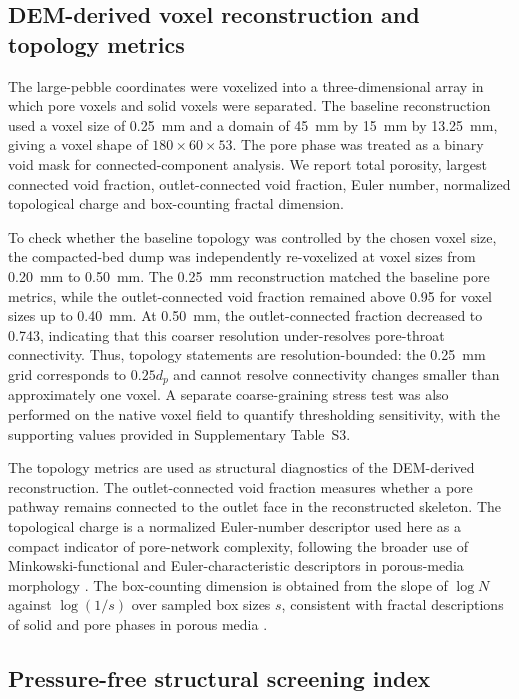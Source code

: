 \documentclass[preprint,12pt,authoryear]{elsarticle}
\begin{document}
\subsection{DEM-derived voxel reconstruction and topology metrics}

The large-pebble coordinates were voxelized into a three-dimensional array in which pore voxels and solid voxels were separated. The baseline reconstruction used a voxel size of \SI{0.25}{mm} and a domain of \SI{45}{mm} by \SI{15}{mm} by \SI{13.25}{mm}, giving a voxel shape of $180 \times 60 \times 53$. The pore phase was treated as a binary void mask for connected-component analysis. We report total porosity, largest connected void fraction, outlet-connected void fraction, Euler number, normalized topological charge and box-counting fractal dimension.

To check whether the baseline topology was controlled by the chosen voxel size, the compacted-bed dump was independently re-voxelized at voxel sizes from \SI{0.20}{mm} to \SI{0.50}{mm}. The \SI{0.25}{mm} reconstruction matched the baseline pore metrics, while the outlet-connected void fraction remained above 0.95 for voxel sizes up to \SI{0.40}{mm}. At \SI{0.50}{mm}, the outlet-connected fraction decreased to 0.743, indicating that this coarser resolution under-resolves pore-throat connectivity. Thus, topology statements are resolution-bounded: the \SI{0.25}{mm} grid corresponds to $0.25d_p$ and cannot resolve connectivity changes smaller than approximately one voxel. A separate coarse-graining stress test was also performed on the native voxel field to quantify thresholding sensitivity, with the supporting values provided in Supplementary Table~S3.

The topology metrics are used as structural diagnostics of the DEM-derived reconstruction. The outlet-connected void fraction measures whether a pore pathway remains connected to the outlet face in the reconstructed skeleton. The topological charge is a normalized Euler-number descriptor used here as a compact indicator of pore-network complexity, following the broader use of Minkowski-functional and Euler-characteristic descriptors in porous-media morphology \citep{Armstrong2019Minkowski}. The box-counting dimension is obtained from the slope of $\log N$ against $\log(1/s)$ over sampled box sizes $s$, consistent with fractal descriptions of solid and pore phases in porous media \citep{Dathe2005Fractal}.

\subsection{Pressure-free structural screening index}
\end{document}
